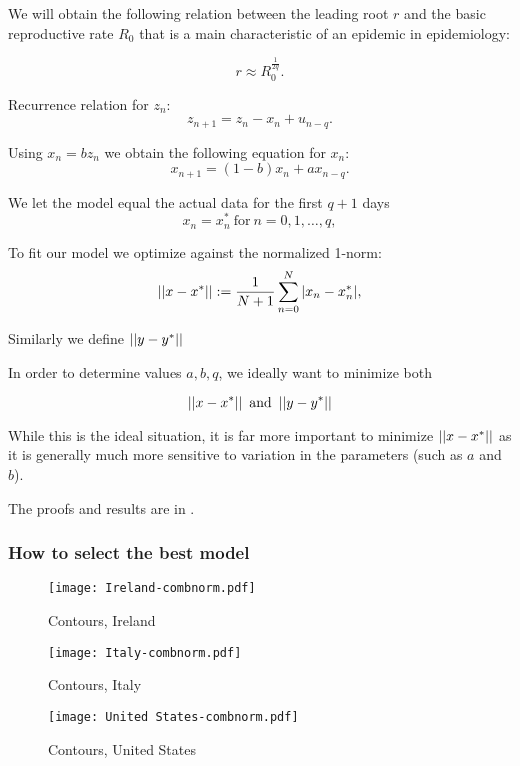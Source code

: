 We will obtain the following relation between the leading root $r$ and the basic reproductive rate $R_0$ that is a main characteristic of an epidemic in epidemiology:

\begin{equation}\label{eq:R0}
    r \approx R_0^{\frac1{2q}}.
\end{equation}

Recurrence relation for $z_n$:
\begin{equation} \label{eq:znrecurr}
    z_{n+1} = z_n - x_n + u_{n-q}.
\end{equation}

Using $x_n = bz_n$ we obtain the following equation for $x_n$:
\begin{equation} \label{eq:xnrecurr}
    x_{n+1} = (1 - b) x_n + ax_{n-q}.
\end{equation}

We let the model equal the actual data for the first $q+1$ days
\begin{equation} \label{eq:xn0q}
x_n = x^*_n \ \text{for} \ n = 0, 1, \dots , q,
\end{equation}

 To fit our model we optimize against the normalized 1-norm:
\begin{equation}\label{eq:xnnorm}
    \left|\left|x-x^*\right|\right|:= \frac{1}{N+1} \sum\limits_{n=0}^N |x_n-x_n^*|,
\end{equation}

Similarly we define $\left|\left|y-y^*\right|\right|$

In order to determine values $a,b,q$, we ideally want to minimize both 

\begin{equation} \label{eq:norms}
    \left|\left|x-x^*\right|\right| \ \text{and} \ \left|\left|y-y^*\right|\right|
\end{equation}

While this is the ideal situation, it is far more important to minimize $\left|\left|x-x^*\right|\right|$ as it is generally much more sensitive to variation in the parameters (such as $a$ and $b$).


The proofs and results are in \label{ch:theorems}.



\subsubsection{How to select the best model}

\begin{figure}[H]
  \texttt{[image: Ireland-combnorm.pdf]} \label{fig:ireland-combnorm}
\caption{Contours, Ireland}
\endminipage\hfill
{}
  \texttt{[image: Italy-combnorm.pdf]} \label{fig:italy-combnorm}
\caption{Contours, Italy}
\endminipage\hfill
{}
  \texttt{[image: United States-combnorm.pdf]} \label{fig:usa-combnorm}
\caption{Contours, United States}
\endminipage\hfill
\end{figure}

